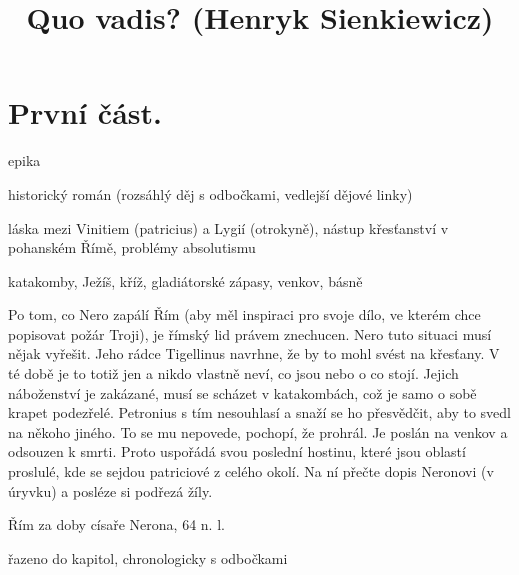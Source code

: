 \documentclass{article}
\title{\vspace{-2cm}Quo vadis? (Henryk Sienkiewicz)\vspace{-2cm}}
\date{}
\author{}
\begin{document}
\maketitle
\section{První část.}
\begin{description}
    \setlength\itemsep{0.15em}
    \item[druh:] epika
    \item[žánr:] historický román (rozsáhlý děj s odbočkami, vedlejší dějové linky)
    \item[téma:] láska mezi Vinitiem (patricius) a Lygií (otrokyně), nástup křesťanství v pohanském Římě, problémy absolutismu
    \item[motivy:] katakomby, Ježíš, kříž, gladiátorské zápasy, venkov, básně
    \item[zařazení výňatku do kontextu díla:] Po tom, co Nero zapálí Řím (aby měl inspiraci pro svoje dílo, ve kterém chce popisovat požár Troji), je římský lid právem znechucen. Nero tuto situaci musí nějak vyřešit. Jeho rádce Tigellinus navrhne, že by to mohl svést na křesťany. V té době je to totiž jen  a nikdo vlastně neví, co jsou nebo o co stojí. Jejich náboženství je zakázané, musí se scházet v katakombách, což je samo o sobě krapet podezřelé. Petronius s tím nesouhlasí a snaží se ho přesvědčit, aby to svedl na někoho jiného. To se mu nepovede, pochopí, že prohrál. Je poslán na venkov a odsouzen k smrti. Proto uspořádá svou poslední hostinu, které jsou oblastí proslulé, kde se sejdou patriciové z celého okolí. Na ní přečte dopis Neronovi (v úryvku) a posléze si podřezá žíly.
    \item[časoprostor:] Řím za doby císaře Nerona, 64 n. l.
    \item[kompoziční výstavba:] řazeno do kapitol, chronologicky s odbočkami
\end{description}
\end{document}
